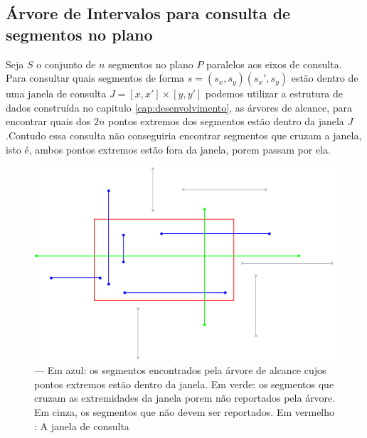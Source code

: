 \subsection{Árvore de Intervalos para consulta de segmentos no plano}

Seja $S$ o conjunto de $n$ segmentos no plano $P$ paralelos aos eixos de consulta. Para consultar quais segmentos de forma $s=(s_x,s_y)(s_x', s_y)$ estão dentro de uma janela de consulta $J = [x, x'] \times [y, y']$ podemos utilizar a estrutura de dados construída no capitulo \ref{cap:desenvolvimento}, as árvores de alcance, para encontrar quais dos $2n$ pontos extremos dos segmentos estão dentro da janela $J$.Contudo essa consulta não conseguiria encontrar segmentos que cruzam a janela, isto é, ambos pontos extremos estão fora da janela, porem passam por ela.

\begin{figure}[h!]
    \begin{center}
        \includegraphics{images/interval_tree7.pdf}
    \end{center}
    \caption{ — Em azul: os segmentos encontrados pela árvore de alcance cujos pontos extremos estão dentro da janela. Em verde: os segmentos que cruzam as extremidades da janela porem não reportados pela árvore. Em cinza, os segmentos que não devem ser reportados. Em vermelho : A janela de consulta}
    \label{fig:21}
\end{figure}

